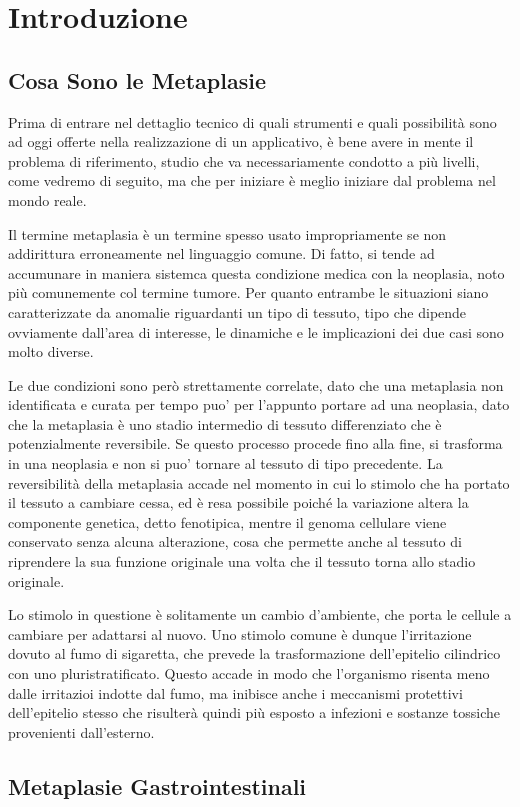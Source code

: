 \chapter{Introduzione}
\section{Cosa Sono le Metaplasie}

Prima di entrare nel dettaglio tecnico di quali strumenti
e quali possibilità sono ad oggi offerte nella realizzazione
di un applicativo, è bene avere in mente il problema di riferimento,
studio che va necessariamente condotto a più livelli, come vedremo
di seguito, ma che per iniziare è meglio iniziare dal problema
nel mondo reale.

Il termine metaplasia è un termine spesso usato impropriamente 
se non addirittura erroneamente nel linguaggio comune.
Di fatto, si tende ad accumunare in maniera sistemca
questa condizione medica con la neoplasia, noto più comunemente col termine tumore.
Per quanto entrambe le situazioni siano caratterizzate da anomalie
riguardanti un tipo di tessuto, tipo che dipende ovviamente dall'area di interesse,
le dinamiche e le implicazioni dei due casi sono molto diverse.

Le due condizioni sono però strettamente correlate, dato che una metaplasia
non identificata e curata per tempo puo' per l'appunto portare ad una neoplasia,
dato che la metaplasia è uno stadio intermedio di tessuto differenziato che
è potenzialmente reversibile.
Se questo processo procede fino alla fine, si trasforma in una neoplasia e
non si puo' tornare al tessuto di tipo precedente.
La reversibilità della metaplasia accade nel momento in cui lo stimolo
che ha portato il tessuto a cambiare cessa, ed è resa possibile poiché
la variazione altera la componente genetica, detto fenotipica, mentre il
genoma cellulare viene conservato senza alcuna alterazione, cosa che permette
anche al tessuto di riprendere la sua funzione originale una volta che
il tessuto torna allo stadio originale.

Lo stimolo in questione è solitamente un cambio d'ambiente, che porta le
cellule a cambiare per adattarsi al nuovo.
Uno stimolo comune è dunque l'irritazione dovuto al fumo di sigaretta, che
prevede la trasformazione dell'epitelio cilindrico con uno pluristratificato.
Questo accade in modo che l'organismo risenta meno dalle irritazioi indotte
dal fumo, ma inibisce anche i meccanismi protettivi dell'epitelio stesso che
risulterà quindi più esposto a infezioni e sostanze tossiche provenienti
dall'esterno.

\section{Metaplasie Gastrointestinali}

